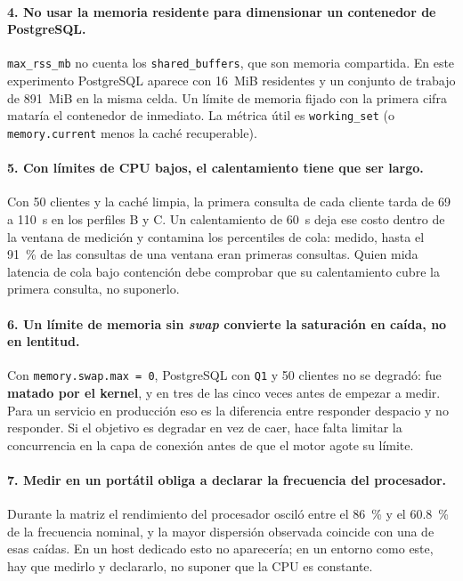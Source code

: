 \paragraph{4. No usar la memoria residente para dimensionar un contenedor de PostgreSQL.}
\texttt{max\_rss\_mb} no cuenta los \texttt{shared\_buffers}, que son memoria
compartida. En este experimento PostgreSQL aparece con 16~MiB residentes y un
conjunto de trabajo de 891~MiB en la misma celda. Un límite de memoria fijado con
la primera cifra mataría el contenedor de inmediato. La métrica útil es
\texttt{working\_set} (o \texttt{memory.current} menos la caché recuperable).

\paragraph{5. Con límites de CPU bajos, el calentamiento tiene que ser largo.}
Con 50 clientes y la caché limpia, la primera consulta de cada cliente tarda de
69 a 110~s en los perfiles B y C. Un calentamiento de 60~s deja ese costo dentro
de la ventana de medición y contamina los percentiles de cola: medido, hasta el
91~\% de las consultas de una ventana eran primeras consultas. Quien mida latencia
de cola bajo contención debe comprobar que su calentamiento cubre la primera
consulta, no suponerlo.

\paragraph{6. Un límite de memoria sin \emph{swap} convierte la saturación en caída, no en lentitud.}
Con \texttt{memory.swap.max = 0}, PostgreSQL con \texttt{Q1} y 50 clientes no se
degradó: fue \textbf{matado por el kernel}, y en tres de las cinco veces antes de
empezar a medir. Para un servicio en producción eso es la diferencia entre
responder despacio y no responder. Si el objetivo es degradar en vez de caer, hace
falta limitar la concurrencia en la capa de conexión antes de que el motor agote su
límite.

\paragraph{7. Medir en un portátil obliga a declarar la frecuencia del procesador.}
Durante la matriz el rendimiento del procesador osciló entre el 86~\% y el
60.8~\% de la frecuencia nominal, y la mayor dispersión observada coincide con una
de esas caídas. En un host dedicado esto no aparecería; en un entorno como este,
hay que medirlo y declararlo, no suponer que la CPU es constante.
